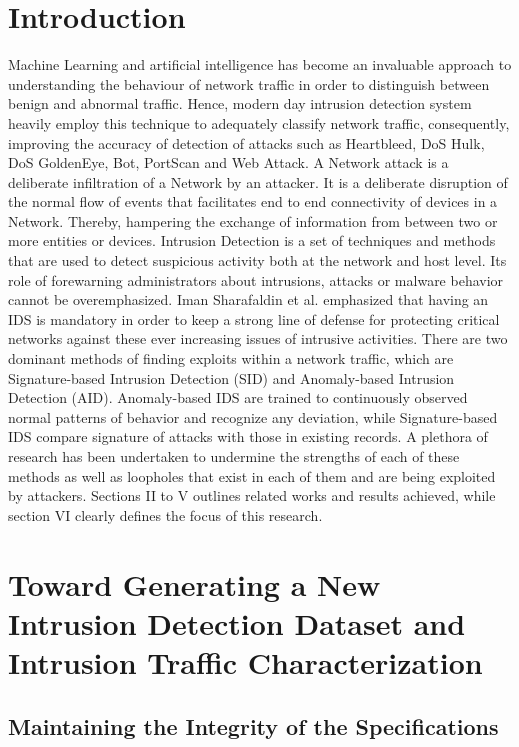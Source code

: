 \documentclass[conference]{IEEEtran}
\begin{document}
\section{Introduction}
Machine Learning and artificial intelligence has become an invaluable approach to understanding the behaviour of network traffic in order to distinguish between benign and abnormal traffic. Hence, modern day intrusion detection system heavily employ this technique to adequately classify network traffic, consequently, improving the accuracy of detection of attacks such as Heartbleed, DoS Hulk, DoS GoldenEye, Bot, PortScan and Web Attack.
A Network attack is a deliberate infiltration of a Network by an attacker. It is a deliberate disruption of the normal flow of events that facilitates end to end connectivity of devices in a Network. Thereby, hampering the exchange of information from between two or more entities or devices.
Intrusion Detection is a set of techniques and methods that are used to detect suspicious activity both at the network and host level. Its role of forewarning administrators about intrusions, attacks or malware behavior cannot be overemphasized. Iman Sharafaldin et al. emphasized that having an IDS is mandatory in order to keep a strong line of defense for protecting critical networks against these ever increasing issues of intrusive activities. There are two dominant methods of finding exploits within a network traffic, which are Signature-based Intrusion Detection (SID) and Anomaly-based Intrusion Detection (AID). Anomaly-based IDS are trained to continuously observed normal patterns of behavior and recognize any deviation, while Signature-based IDS compare signature of attacks with those in existing records. A plethora of research has been undertaken to undermine the strengths of each of these methods as well as loopholes that exist in each of them and are being exploited by attackers. Sections II to V outlines related works and results achieved, while section VI clearly defines the focus of this research. 


\section{Toward Generating a New Intrusion Detection Dataset and Intrusion Traffic Characterization}

\subsection{Maintaining the Integrity of the Specifications}
\end{document}
